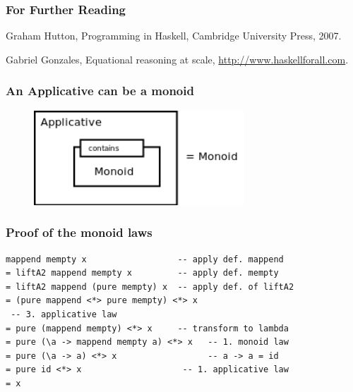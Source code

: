 \documentclass{beamer}
\begin{document}
\begin{frame}
  \frametitle{For Further Reading}

  \begin{thebibliography}{Subramaniam, 2011}

Graham Hutton,
Programming in Haskell,
Cambridge University Press,
2007.

Gabriel Gonzales,
Equational reasoning at scale, 
\url{http://www.haskellforall.com}.

\end{thebibliography}
\end{frame}

\appendix

\begin{frame}[fragile]
  \frametitle{An Applicative can be a monoid}
\begin{figure}
  \centering
     \includegraphics[width=0.7\textwidth]{monoid}
\end{figure}
\end{frame}

\begin{frame}[fragile]
  \frametitle{Proof of the monoid laws}
\begin{verbatim}
mappend mempty x                  -- apply def. mappend
= liftA2 mappend mempty x         -- apply def. mempty
= liftA2 mappend (pure mempty) x  -- apply def. of liftA2
= (pure mappend <*> pure mempty) <*> x   
 -- 3. applicative law
= pure (mappend mempty) <*> x     -- transform to lambda
= pure (\a -> mappend mempty a) <*> x   -- 1. monoid law 
= pure (\a -> a) <*> x                  -- a -> a = id
= pure id <*> x                    -- 1. applicative law
= x
\end{verbatim}

\end{frame}
\end{document}
